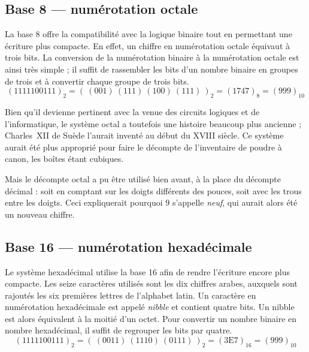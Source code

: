 \documentclass[canadien,12pt,oneside,letterpaper]{article}
\begin{document}
\subsection{Base 8 --- numérotation octale}

La base 8 offre la compatibilité avec la logique binaire tout en permettant une écriture plus compacte. En effet, un chiffre en numérotation octale équivaut à trois bits. La conversion de la numérotation binaire à la numérotation octale est ainsi très simple ; il suffit de rassembler les bits d'un nombre binaire en groupes de trois et à convertir chaque groupe de trois bits.
\begin{equation*}
\left(1111100111\right)_2=\left(~\left(001\right)~\left(111\right)~\left(100\right)~\left(111\right)~\right)_2=\left(1747\right)_8=\left(999\right)_{10}
\end{equation*}

Bien qu'il devienne pertinent avec la venue des circuits logiques et de l'informatique, le système octal a toutefois une histoire beaucoup plus ancienne ; Charles~XII de Suède l'aurait inventé au début du XVIII siècle. Ce système aurait été plus approprié pour faire le décompte de l'inventaire de poudre à canon, les boîtes étant cubiques.

Mais le décompte octal a pu être utilisé bien avant, à la place du décompte décimal : soit en comptant sur les doigts différents des pouces, soit avec les trous entre les doigts. Ceci expliquerait pourquoi $9$ s'appelle \textit{neuf}, qui aurait alors été un nouveau chiffre.


\subsection{Base 16 --- numérotation hexadécimale}

Le système hexadécimal utilise la base 16 afin de rendre l'écriture encore plus compacte. Les seize caractères utilisés sont les dix chiffres arabes, auxquels sont rajoutés les six premières lettres de l'alphabet latin. Un caractère en numérotation hexadécimale est appelé \textit{nibble} et contient quatre bits. Un nibble est alors équivalent à la moitié d'un octet. Pour convertir un nombre binaire en nombre hexadécimal, il suffit de regrouper les bits par quatre.
\begin{equation*}
\left(1111100111\right)_2=\left(~\left(0011\right)~\left(1110\right)~\left(0111\right)~\right)_2=\left(3\textrm{E}7\right)_{16}=\left(999\right)_{10}
\end{equation*}
\end{document}
